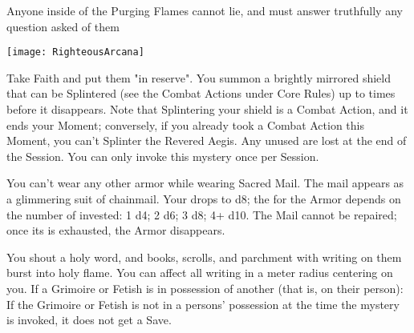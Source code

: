 {Anyone inside of the Purging Flames cannot lie, and must answer truthfully any question asked of them


  \begin{center}
  \texttt{[image: RighteousArcana]}
  \end{center}



\MYSTERY [
  Name = Revered Aegis,
  Link = arcana-mystery-revered-aegis,
  Paradigm = Force,
  Save = n/a,
  Duration = Session,
  Target = Self
]

Take \DICE Faith and put them "in reserve".  You summon a brightly mirrored shield that can be Splintered (see the Combat Actions under Core Rules) up to \DICE times before it disappears.  Note that Splintering your shield is a Combat Action, and it ends your Moment; conversely, if you already took a Combat Action this Moment, you can’t Splinter the Revered Aegis.  Any unused \DICE are lost at the end of the Session.  You can only invoke this mystery once per Session.

\MYSTERY [
  Name = Sacred Mail,
  Link = arcana-mystery-sacred-mail,
  Paradigm = Force,
  Save = n/a,
  Duration = Session,
  Target = Self
]

You can't wear any other armor while wearing Sacred Mail.  The mail appears as a glimmering suit of chainmail.  Your \MD drops to d8; the \UD for the Armor depends on the number of \DICE invested:  1 d4; 2 d6; 3 d8; 4+ d10. The Mail cannot be repaired; once its \UD is exhausted, the Armor disappears.

\MYSTERY [
  Name = Satanic Verses,
  Link = arcana-mystery-satanic-verses,
  Paradigm = Entropy,
  Save = See Below,
  Duration = Instant,
  Target = Close
]

You shout a holy word, and books, scrolls, and parchment with writing on them burst into holy flame.  You can affect all writing in a \DICE meter radius centering on you.  If a Grimoire or Fetish is in possession of another (that is, on their person):
If the Grimoire or Fetish is not in a persons' possession at the time the mystery is invoked, it does not get a Save.

}
